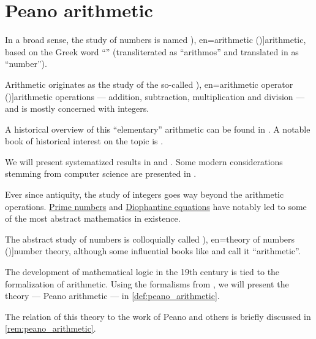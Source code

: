 \section{Peano arithmetic}\label{sec:peano_arithmetic}

\begin{concept}\label{con:arithmetic}
  In a broad sense, the study of numbers is named \term[ru=арифметика (\cite[48]{БашмаковаЮшкевич1951ПроисхождениеСистемСчисления}), en=arithmetic (\cite[3]{Stillwell2010MathHistory})]{arithmetic}, based on the Greek word \enquote{} (transliterated as \enquote{arithmos} and translated in \cite[217]{DiggleEtAl2021CambridgeGreekLexicon} as \enquote{number}).

  \begin{itemize}
     Arithmetic originates as the study of the so-called \term[ru=арифметические операции (\cite[101]{Проскуряков1951ТеоретическиеОсновыАрифметики}), en=arithmetic operator (\cite[131]{Knuth1997ArtVol1})]{arithmetic operations} --- addition, subtraction, multiplication and division --- and is mostly concerned with integers.

    A historical overview of this \enquote{elementary} arithmetic can be found in \cite{Karpinski1925HistoryOfArithmetic}. A notable book of historical interest on the topic is \cite{Fibonacci2002LiberAbaci}.

    We will present systematized results in  and . Some modern considerations stemming from computer science are presented in .

     Ever since antiquity, the study of integers goes way beyond the arithmetic operations. \hyperref[def:prime_number]{Prime numbers} and \hyperref[def:polynomial_equation/diophantine]{Diophantine equations} have notably led to some of the most abstract mathematics in existence.

    The abstract study of numbers is colloquially called \term[ru=теория чисел (\cite[7]{Бухштаб1966ТеорияЧисел}), en=theory of numbers (\cite[1]{Apostol1976AnalyticNumberTheory})]{number theory}, although some influential books like \cite{Gauss1801DisquisitionesArithmeticae} and \cite{Serre1973Arithmetic} call it \enquote{arithmetic}.

     The development of mathematical logic in the 19th century is tied to the formalization of arithmetic. Using the formalisms from , we will present the theory  --- Peano arithmetic --- in \cref{def:peano_arithmetic}.

    The relation of this theory to the work of Peano and others is briefly discussed in \cref{rem:peano_arithmetic}.
  \end{itemize}
\end{concept}

